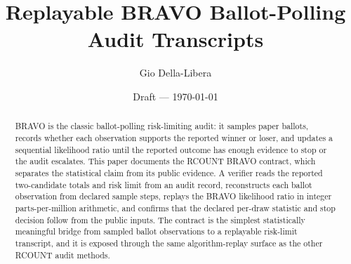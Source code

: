 \documentclass[12pt]{article}
\title{Replayable BRAVO Ballot-Polling Audit Transcripts}
\author{Gio Della-Libera}
\date{Draft --- \today}
\begin{document}
\maketitle

\begin{abstract}
BRAVO is the classic ballot-polling risk-limiting audit: it samples paper
ballots, records whether each observation supports the reported winner or
loser, and updates a sequential likelihood ratio until the reported outcome has
enough evidence to stop or the audit escalates. This paper documents the RCOUNT
BRAVO contract, which separates the statistical claim from its public evidence.
A verifier reads the reported two-candidate totals and risk limit from an audit
record, reconstructs each ballot observation from declared sample steps, replays
the BRAVO likelihood ratio in integer parts-per-million arithmetic, and confirms
that the declared per-draw statistic and stop decision follow from the public
inputs. The contract is the simplest statistically meaningful bridge from
sampled ballot observations to a replayable risk-limit transcript, and it is
exposed through the same algorithm-replay surface as the other RCOUNT audit
methods.
\end{abstract}








\nocite{rcount-overview-2026,rcount-v7-2026}


\end{document}
